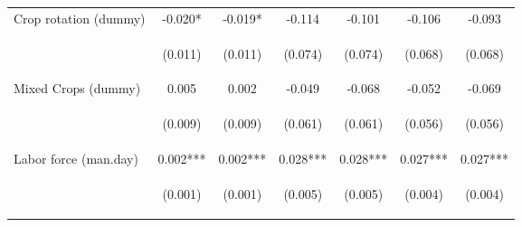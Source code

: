 \begin{center}
\begin{tabular}{lcccccc}
Crop rotation (dummy) & -0.020* & -0.019* & -0.114 & -0.101 & -0.106 & -0.093 \\
\vspace{4pt} & \begin{footnotesize}(0.011)\end{footnotesize} & \begin{footnotesize}(0.011)\end{footnotesize} & \begin{footnotesize}(0.074)\end{footnotesize} & \begin{footnotesize}(0.074)\end{footnotesize} & \begin{footnotesize}(0.068)\end{footnotesize} & \begin{footnotesize}(0.068)\end{footnotesize} \\
Mixed Crops (dummy) & 0.005 & 0.002 & -0.049 & -0.068 & -0.052 & -0.069 \\
\vspace{4pt} & \begin{footnotesize}(0.009)\end{footnotesize} & \begin{footnotesize}(0.009)\end{footnotesize} & \begin{footnotesize}(0.061)\end{footnotesize} & \begin{footnotesize}(0.061)\end{footnotesize} & \begin{footnotesize}(0.056)\end{footnotesize} & \begin{footnotesize}(0.056)\end{footnotesize} \\
Labor force (man.day) & 0.002*** & 0.002*** & 0.028*** & 0.028*** & 0.027*** & 0.027*** \\
\vspace{4pt} & \begin{footnotesize}(0.001)\end{footnotesize} & \begin{footnotesize}(0.001)\end{footnotesize} & \begin{footnotesize}(0.005)\end{footnotesize} & \begin{footnotesize}(0.005)\end{footnotesize} & \begin{footnotesize}(0.004)\end{footnotesize} & \begin{footnotesize}(0.004)\end{footnotesize} \\

\end{tabular}
\end{center}
